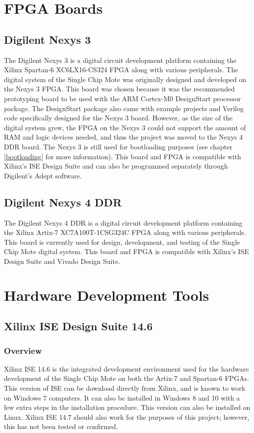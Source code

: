 \section{FPGA Boards}
\subsection{Digilent Nexys 3}
The Digilent Nexys 3 \cite{nexys3-store} is a digital circuit development platform containing the Xilinx Spartan-6 XC6LX16-CS324 FPGA along with various peripherals. The digital system of the Single Chip Mote was originally designed and developed on the Nexys 3 FPGA. This board was chosen because it was the recommended prototyping board to be used with the ARM Cortex-M0 DesignStart processor package. The DesignStart package also came with example projects and Verilog code specifically designed for the Nexys 3 board. However, as the size of the digital system grew, the FPGA on the Nexys 3 could not support the amount of RAM and logic devices needed, and thus the project was moved to the Nexys 4 DDR board. The Nexys 3 is still used for bootloading purposes (see chapter \ref{bootloading} for more information). This board and FPGA is compatible with Xilinx's ISE Design Suite and can also be programmed separately through Digilent's Adept software. %

\subsection{Digilent Nexys 4 DDR}
The Digilent Nexys 4 DDR \cite{nexys4-store} is a digital circuit development platform containing the Xilinx Artix-7 XC7A100T-1CSG324C FPGA along with various peripherals. This board is currently used for design, development, and testing of the Single Chip Mote digital system. This board and FPGA is compatible with Xilinx's ISE Design Suite and Vivado Design Suite.


\section{Hardware Development Tools}
\subsection{Xilinx ISE Design Suite 14.6}

\subsubsection{Overview}
Xilinx ISE 14.6 is the integrated development environment used for the hardware development of the Single Chip Mote on both the Artix-7 and Spartan-6 FPGAs. This version of ISE can be download directly from Xilinx, and is known to work on Windows 7 computers. It can also be installed in Windows 8 and 10 with a few extra steps in the installation procedure. This version can also be installed on Linux. Xilinx ISE 14.7 should also work for the purposes of this project; however, this has not been tested or confirmed. %

